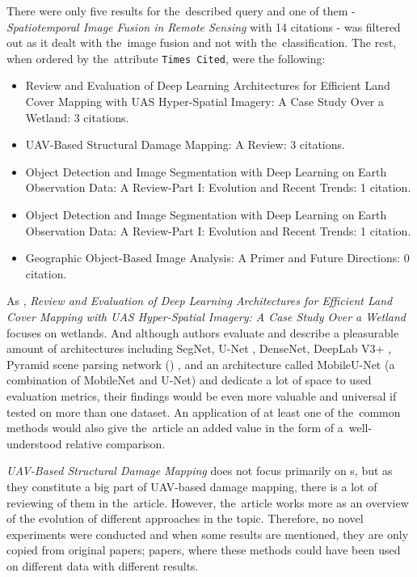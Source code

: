 \noindent There were only five results for the~described query and one of them - \textit{Spatiotemporal Image Fusion in Remote Sensing} \cite{review-st-fusion} with 14 citations - was filtered out as it dealt with the~image fusion and not with the~classification. The rest, when ordered by the~attribute \verb|Times Cited|, were the following:

\begin{itemize}
	\item Review and Evaluation of Deep Learning Architectures for Efficient Land Cover Mapping with UAS Hyper-Spatial Imagery: A Case Study Over a Wetland: 3 citations. \cite{review-dl-wetlands}
	\item UAV-Based Structural Damage Mapping: A Review: 3 citations. \cite{uav-building-damages}
	\item Object Detection and Image Segmentation with Deep Learning on Earth Observation Data: A Review-Part I: Evolution and Recent Trends: 1 citation. \cite{review-dl-eo}
	\item Object Detection and Image Segmentation with Deep Learning on Earth Observation Data: A Review-Part I: Evolution and Recent Trends: 1 citation. \cite{review-dl-eo}
	\item Geographic Object-Based Image Analysis: A Primer and Future Directions: 0 citation. \cite{geobia}
\end{itemize}

As \cite{very-deep-cnn-lc}, \textit{Review and Evaluation of Deep Learning Architectures for Efficient Land Cover Mapping with UAS Hyper-Spatial Imagery: A Case Study Over a Wetland} focuses on wetlands. And although authors evaluate and describe a pleasurable amount of architectures including SegNet, U-Net \cite{u-net}, DenseNet, DeepLab V3+ \cite{deeplab}, Pyramid scene parsing network () \cite{pspnet}, and an architecture called MobileU-Net (a combination of MobileNet \cite{mobilenet} and U-Net) and dedicate a lot of space to used evaluation metrics, their findings would be even more valuable and universal if tested on more than one dataset. An application of at least one of the~common  methods would also give the~article an added value in the form of a~well-understood relative comparison.

\textit{UAV-Based Structural Damage Mapping} does not focus primarily on s, but as they constitute a big part of UAV-based damage mapping, there is a lot of reviewing of them in the~article. However, the~article works more as an overview of the evolution of different approaches in the topic. Therefore, no novel experiments were conducted and when some results are mentioned, they are only copied from original papers; papers, where these methods could have been used on different data with different results.


